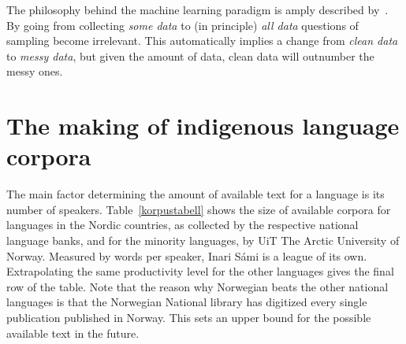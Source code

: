 \documentclass[free]{flammie}
\begin{document}
The philosophy behind the machine learning paradigm is amply described
by~\cite{Cuckier2013rise}. By going from collecting \textit{some
data} to (in principle) \textit{all data} questions of sampling become
irrelevant. This automatically implies a change from \textit{clean data} to
\textit{messy data}, but given the amount of data, clean data will outnumber the
messy ones.

\section{The making of indigenous language corpora}

The main factor determining the amount of available text for a language is its
number of speakers. Table~\ref{korpustabell} shows the size of available corpora
for languages in the Nordic countries, as collected by the respective national
language banks, and for the minority languages, by UiT The Arctic University of
Norway.  Measured by words per speaker, Inari Sámi is a league of its own.
Extrapolating the same productivity level for the other languages gives the
final row of the table. Note that the reason why Norwegian beats the other
national languages  is that the Norwegian National library has digitized every
single publication published in Norway.  This sets an upper bound for the
possible available text in the future.
\end{document}
